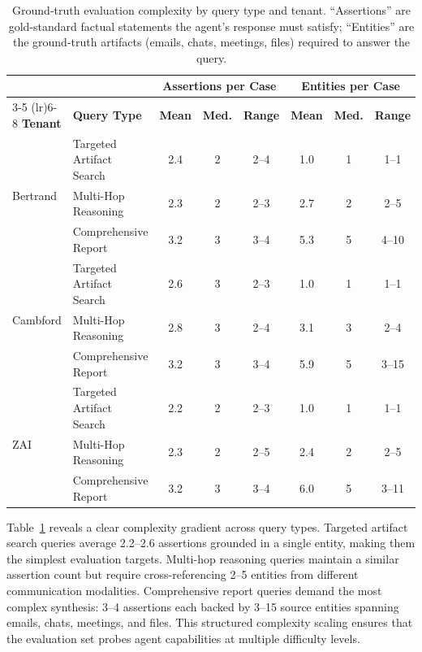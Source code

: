 \begin{table}[h]
\centering
\caption{Ground-truth evaluation complexity by query type and tenant.
``Assertions'' are gold-standard factual statements the agent's response must satisfy;
``Entities'' are the ground-truth artifacts (emails, chats, meetings, files) required to answer the query.}
\label{tab:ground_truth}
\small
\begin{tabular}{llcccccc}
\toprule
& & \multicolumn{3}{c}{\textbf{Assertions per Case}} & \multicolumn{3}{c}{\textbf{Entities per Case}} \\
\cmidrule(lr){3-5} \cmidrule(lr){6-8}
\textbf{Tenant} & \textbf{Query Type} & \textbf{Mean} & \textbf{Med.} & \textbf{Range} & \textbf{Mean} & \textbf{Med.} & \textbf{Range} \\
\midrule
\multirow{3}{*}{Bertrand}
  & Targeted Artifact Search  & 2.4 & 2 & 2--4  & 1.0 & 1 & 1--1  \\
  & Multi-Hop Reasoning        & 2.3 & 2 & 2--3  & 2.7 & 2 & 2--5  \\
  & Comprehensive Report       & 3.2 & 3 & 3--4  & 5.3 & 5 & 4--10 \\
\midrule
\multirow{3}{*}{Cambford}
  & Targeted Artifact Search  & 2.6 & 3 & 2--3  & 1.0 & 1 & 1--1  \\
  & Multi-Hop Reasoning        & 2.8 & 3 & 2--4  & 3.1 & 3 & 2--4  \\
  & Comprehensive Report       & 3.2 & 3 & 3--4  & 5.9 & 5 & 3--15 \\
\midrule
\multirow{3}{*}{ZAI}
  & Targeted Artifact Search  & 2.2 & 2 & 2--3  & 1.0 & 1 & 1--1  \\
  & Multi-Hop Reasoning        & 2.3 & 2 & 2--5  & 2.4 & 2 & 2--5  \\
  & Comprehensive Report       & 3.2 & 3 & 3--4  & 6.0 & 5 & 3--11 \\
\bottomrule
\end{tabular}
\end{table}

\noindent Table~\ref{tab:ground_truth} reveals a clear complexity gradient across query types. Targeted artifact search queries average 2.2--2.6 assertions grounded in a single entity, making them the simplest evaluation targets. Multi-hop reasoning queries maintain a similar assertion count but require cross-referencing 2--5 entities from different communication modalities. Comprehensive report queries demand the most complex synthesis: 3--4 assertions each backed by 3--15 source entities spanning emails, chats, meetings, and files. This structured complexity scaling ensures that the evaluation set probes agent capabilities at multiple difficulty levels.

